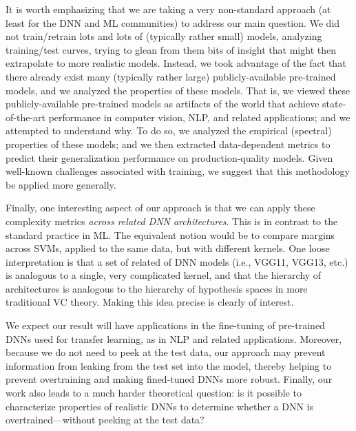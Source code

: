 {It is worth emphasizing that 
we are taking a 
very %
non-standard approach (at least for the DNN and ML communities) to address our main question.
We did not train/retrain lots and lots of (typically rather small) models, analyzing training/test curves, trying to glean from them bits of insight that might then extrapolate to more realistic models.
Instead, we took advantage of the fact that there already exist many (typically rather large) publicly-available pre-trained models, and we analyzed the properties of these models.
That is, we viewed these publicly-available pre-trained models as artifacts of the world that achieve state-of-the-art performance in computer vision, NLP, and related applications; and we attempted to understand why.
To do so, we analyzed the empirical (spectral) properties of these models; 
and we then extracted data-dependent metrics to predict their generalization performance on production-quality models.
Given well-known challenges associated with training, 
we suggest that this methodology be applied more generally.

Finally, one interesting aspect of our approach is that we can apply these complexity metrics \emph{across related DNN architectures}. 
This is in contrast to the standard practice in ML.
The equivalent notion would be to compare margins across SVMs, applied to the same data, but with different kernels. 
One loose interpretation is that a set of related of DNN models (i.e., VGG11, VGG13, etc.) is analogous to a single, very complicated kernel, and that the hierarchy of architectures is analogous to the hierarchy of hypothesis spaces in more traditional VC theory.
Making this idea precise is clearly of interest.

We expect our result will have applications in the fine-tuning of pre-trained DNNs used for transfer learning, as in NLP and related applications.
Moreover, because we do not need to peek at the test data, our approach may prevent information from leaking from the test set into the model, thereby helping to prevent overtraining and making fined-tuned DNNs more robust.
Finally, our work also leads to a much harder theoretical question: is it possible to characterize properties of realistic DNNs to determine whether a DNN is overtrained---without peeking at the test data?  
 

}
